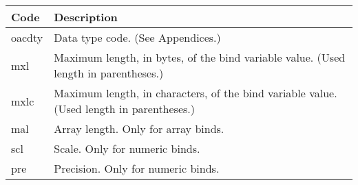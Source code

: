 \begin{longtable}[]{@{}l|l@{}}
\toprule
\begin{minipage}[b]{0.14\columnwidth}\raggedright\strut
Code\strut
\end{minipage} & \begin{minipage}[b]{0.65\columnwidth}\raggedright\strut
Description\strut
\end{minipage}\tabularnewline
\midrule
\endhead
\begin{minipage}[t]{0.14\columnwidth}\raggedright\strut
oacdty\strut
\end{minipage} & \begin{minipage}[t]{0.65\columnwidth}\raggedright\strut
Data type code. (See Appendices.)\strut
\end{minipage}\tabularnewline
\begin{minipage}[t]{0.14\columnwidth}\raggedright\strut
mxl\strut
\end{minipage} & \begin{minipage}[t]{0.65\columnwidth}\raggedright\strut
Maximum length, in bytes, of the bind variable value. (Used length in
parentheses.)\strut
\end{minipage}\tabularnewline
\begin{minipage}[t]{0.14\columnwidth}\raggedright\strut
mxlc\strut
\end{minipage} & \begin{minipage}[t]{0.65\columnwidth}\raggedright\strut
Maximum length, in characters, of the bind variable value. (Used length
in parentheses.)\strut
\end{minipage}\tabularnewline
\begin{minipage}[t]{0.14\columnwidth}\raggedright\strut
mal\strut
\end{minipage} & \begin{minipage}[t]{0.65\columnwidth}\raggedright\strut
Array length. Only for array binds.\strut
\end{minipage}\tabularnewline
\begin{minipage}[t]{0.14\columnwidth}\raggedright\strut
scl\strut
\end{minipage} & \begin{minipage}[t]{0.65\columnwidth}\raggedright\strut
Scale. Only for numeric binds.\strut
\end{minipage}\tabularnewline
\begin{minipage}[t]{0.14\columnwidth}\raggedright\strut
pre\strut
\end{minipage} & \begin{minipage}[t]{0.65\columnwidth}\raggedright\strut
Precision. Only for numeric binds.\strut

\end{minipage}
\end{longtable}

